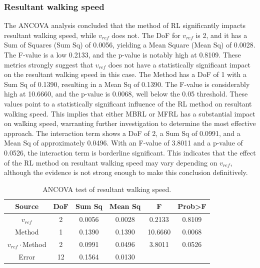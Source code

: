 \subsubsection*{Resultant walking speed}
The ANCOVA analysis concluded that the method of RL significantly impacts resultant walking speed, while $v_{ref}$ does not. The DoF for $v_{ref}$ is 2, and it has a Sum of Squares (Sum Sq) of 0.0056, yielding a Mean Square (Mean Sq) of 0.0028. The F-value is a low 0.2133, and the p-value is notably high at 0.8109. These metrics strongly suggest that $v_{ref}$ does not have a statistically significant impact on the resultant walking speed in this case. The Method has a DoF of 1 with a Sum Sq of 0.1390, resulting in a Mean Sq of 0.1390. The F-value is considerably high at 10.6660, and the p-value is 0.0068, well below the 0.05 threshold. These values point to a statistically significant influence of the RL method on resultant walking speed. This implies that either MBRL or MFRL has a substantial impact on walking speed, warranting further investigation to determine the most effective approach. The interaction term shows a DoF of 2, a Sum Sq of 0.0991, and a Mean Sq of approximately 0.0496. With an F-value of 3.8011 and a p-value of 0.0526, the interaction term is borderline significant. This indicates that the effect of the RL method on resultant walking speed may vary depending on $v_{ref}$, although the evidence is not strong enough to make this conclusion definitively.
\begin{table}[H]
    \centering
    \begin{tabular}{c|ccccc} 
         Source&  DoF&  Sum Sq&  Mean Sq&  F& Prob>F\\ \hline
         $v_{ref}$&  2&  0.0056&  0.0028&  0.2133& 0.8109\\ 
         Method&  1&  0.1390&  0.1390&  10.6660& 0.0068\\ 
         $v_{ref}\cdot$Method&  2&  0.0991&  0.0496&  3.8011& 0.0526\\ 
         Error&  12&  0.1564&  0.0130&  & \\ 
    \end{tabular}
    \caption{ANCOVA test of resultant walking speed.}
    \label{tab:ANCOVA_v}
\end{table}

